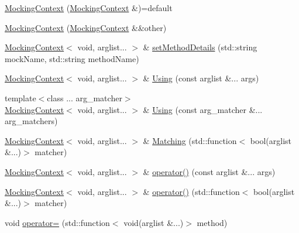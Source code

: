\begin{DoxyCompactItemize}
\item 
\mbox{\hyperlink{classfakeit_1_1MockingContext_3_01void_00_01arglist_8_8_8_01_4_a750dcc8fb80a9931c41143ce73d7177c}{Mocking\+Context}} (\mbox{\hyperlink{classfakeit_1_1MockingContext}{Mocking\+Context}} \&)=default
\item 
\mbox{\hyperlink{classfakeit_1_1MockingContext_3_01void_00_01arglist_8_8_8_01_4_a1f7b3663809191b919290f0db05d59f1}{Mocking\+Context}} (\mbox{\hyperlink{classfakeit_1_1MockingContext}{Mocking\+Context}} \&\&other)
\item 
\mbox{\hyperlink{classfakeit_1_1MockingContext}{Mocking\+Context}}$<$ void, arglist... $>$ \& \mbox{\hyperlink{classfakeit_1_1MockingContext_3_01void_00_01arglist_8_8_8_01_4_a5479ea5b1a1f32898cc9592bfb1c7777}{set\+Method\+Details}} (std\+::string mock\+Name, std\+::string method\+Name)
\item 
\mbox{\hyperlink{classfakeit_1_1MockingContext}{Mocking\+Context}}$<$ void, arglist... $>$ \& \mbox{\hyperlink{classfakeit_1_1MockingContext_3_01void_00_01arglist_8_8_8_01_4_a0dad4e59214a5fdcacad0e4a170df071}{Using}} (const arglist \&... args)
\item 
{\footnotesize template$<$class ... arg\+\_\+matcher$>$ }\\\mbox{\hyperlink{classfakeit_1_1MockingContext}{Mocking\+Context}}$<$ void, arglist... $>$ \& \mbox{\hyperlink{classfakeit_1_1MockingContext_3_01void_00_01arglist_8_8_8_01_4_aaab0ad3883ab87bd3885671e3266546e}{Using}} (const arg\+\_\+matcher \&... arg\+\_\+matchers)
\item 
\mbox{\hyperlink{classfakeit_1_1MockingContext}{Mocking\+Context}}$<$ void, arglist... $>$ \& \mbox{\hyperlink{classfakeit_1_1MockingContext_3_01void_00_01arglist_8_8_8_01_4_a28152fc4e0105f5e6424515367a5d4c3}{Matching}} (std\+::function$<$ bool(arglist \&...)$>$ matcher)
\item 
\mbox{\hyperlink{classfakeit_1_1MockingContext}{Mocking\+Context}}$<$ void, arglist... $>$ \& \mbox{\hyperlink{classfakeit_1_1MockingContext_3_01void_00_01arglist_8_8_8_01_4_a73476d376f7ec5631ba9a37ff5264599}{operator()}} (const arglist \&... args)
\item 
\mbox{\hyperlink{classfakeit_1_1MockingContext}{Mocking\+Context}}$<$ void, arglist... $>$ \& \mbox{\hyperlink{classfakeit_1_1MockingContext_3_01void_00_01arglist_8_8_8_01_4_a1a5a55569a763877d395635979e6b3d6}{operator()}} (std\+::function$<$ bool(arglist \&...)$>$ matcher)
\item 
void \mbox{\hyperlink{classfakeit_1_1MockingContext_3_01void_00_01arglist_8_8_8_01_4_a86584df9e9a7a73b078ad68fa5893d50}{operator=}} (std\+::function$<$ void(arglist \&...)$>$ method)

\end{DoxyCompactItemize}
